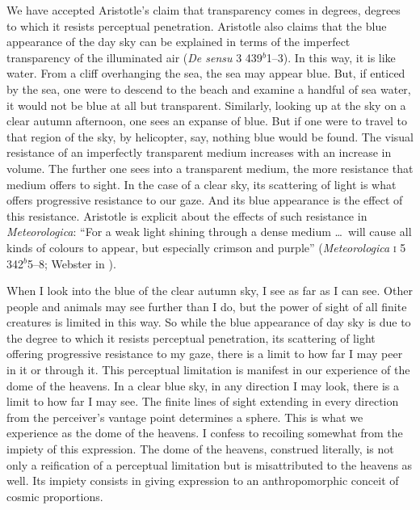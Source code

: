 We have accepted Aristotle's claim that transparency comes in degrees, degrees to which it resists perceptual penetration. Aristotle also claims that the blue appearance of the day sky can be explained in terms of the imperfect transparency of the illuminated air (\emph{De sensu} 3 439\( ^{b} \)1--3). In this way, it is like water. From a cliff overhanging the sea, the sea may appear blue. But, if enticed by the sea, one were to descend to the beach and examine a handful of sea water, it would not be blue at all but transparent. Similarly, looking up at the sky on a clear autumn afternoon, one sees an expanse of blue. But if one were to travel to that region of the sky, by helicopter, say, nothing blue would be found. The visual resistance of an imperfectly transparent medium increases with an increase in volume. The further one sees into a transparent medium, the more resistance that medium offers to sight. In the case of a clear sky, its scattering of light is what offers progressive resistance to our gaze. And its blue appearance is the effect of this resistance. Aristotle is explicit about the effects of such resistance in \emph{Meteorologica}: ``For a weak light shining through a dense medium \ldots\ will cause all kinds of colours to appear, but especially crimson and purple'' (\emph{Meteorologica} \textsc{i} 5 342\( ^{b} \)5--8; Webster in \citealt[8--9]{Barnes:1984uq}).

When I look into the blue of the clear autumn sky, I see as far as I can see. Other people and animals may see further than I do, but the power of sight of all finite creatures is limited in this way. So while the blue appearance of day sky is due to the degree to which it resists perceptual penetration, its scattering of light offering progressive resistance to my gaze, there is a limit to how far I may peer in it or through it. This perceptual limitation is manifest in our experience of the dome of the heavens. In a clear blue sky, in any direction I may look, there is a limit to how far I may see. The finite lines of sight extending in every direction from the perceiver's vantage point determines a sphere. This is what we experience as the dome of the heavens. I confess to recoiling somewhat from the impiety of this expression. The dome of the heavens, construed literally, is not only a reification of a perceptual limitation but is misattributed to the heavens as well. Its impiety consists in giving expression to an anthropomorphic conceit of cosmic proportions.


